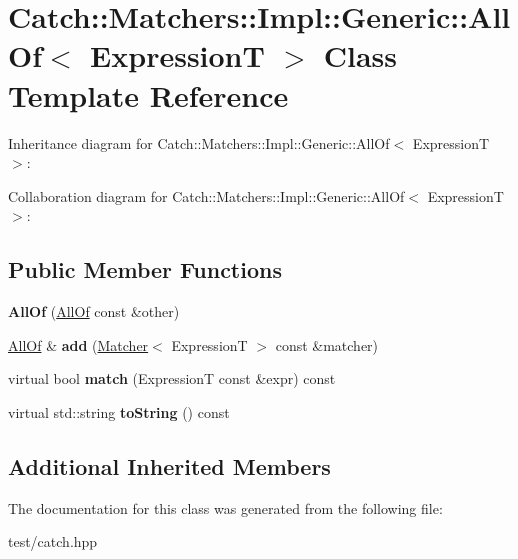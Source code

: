 \hypertarget{classCatch_1_1Matchers_1_1Impl_1_1Generic_1_1AllOf}{}\section{Catch\+:\+:Matchers\+:\+:Impl\+:\+:Generic\+:\+:All\+Of$<$ ExpressionT $>$ Class Template Reference}
\label{classCatch_1_1Matchers_1_1Impl_1_1Generic_1_1AllOf}


Inheritance diagram for Catch\+:\+:Matchers\+:\+:Impl\+:\+:Generic\+:\+:All\+Of$<$ ExpressionT $>$\+:


Collaboration diagram for Catch\+:\+:Matchers\+:\+:Impl\+:\+:Generic\+:\+:All\+Of$<$ ExpressionT $>$\+:
\subsection*{Public Member Functions}
\begin{DoxyCompactItemize}
\item 
{\bfseries All\+Of} (\hyperlink{classCatch_1_1Matchers_1_1Impl_1_1Generic_1_1AllOf}{All\+Of} const \&other)\hypertarget{classCatch_1_1Matchers_1_1Impl_1_1Generic_1_1AllOf_a31f7c5e570e79bdf64064ee87c331a59}{}\label{classCatch_1_1Matchers_1_1Impl_1_1Generic_1_1AllOf_a31f7c5e570e79bdf64064ee87c331a59}

\item 
\hyperlink{classCatch_1_1Matchers_1_1Impl_1_1Generic_1_1AllOf}{All\+Of} \& {\bfseries add} (\hyperlink{structCatch_1_1Matchers_1_1Impl_1_1Matcher}{Matcher}$<$ ExpressionT $>$ const \&matcher)\hypertarget{classCatch_1_1Matchers_1_1Impl_1_1Generic_1_1AllOf_a8c5cd1e494ab697076da418ee72ac297}{}\label{classCatch_1_1Matchers_1_1Impl_1_1Generic_1_1AllOf_a8c5cd1e494ab697076da418ee72ac297}

\item 
virtual bool {\bfseries match} (ExpressionT const \&expr) const \hypertarget{classCatch_1_1Matchers_1_1Impl_1_1Generic_1_1AllOf_a04534d0ac9e089f4500c3c19054f11ce}{}\label{classCatch_1_1Matchers_1_1Impl_1_1Generic_1_1AllOf_a04534d0ac9e089f4500c3c19054f11ce}

\item 
virtual std\+::string {\bfseries to\+String} () const \hypertarget{classCatch_1_1Matchers_1_1Impl_1_1Generic_1_1AllOf_a9febc1e67acbeff62a32bcbfdc0c8fab}{}\label{classCatch_1_1Matchers_1_1Impl_1_1Generic_1_1AllOf_a9febc1e67acbeff62a32bcbfdc0c8fab}

\end{DoxyCompactItemize}
\subsection*{Additional Inherited Members}


The documentation for this class was generated from the following file\+:\begin{DoxyCompactItemize}
\item 
test/catch.\+hpp\end{DoxyCompactItemize}
